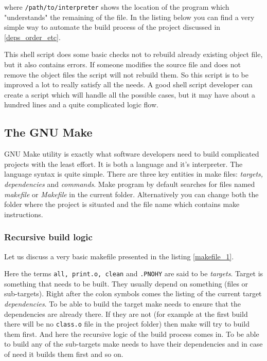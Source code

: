 where {\tt /path/to/interpreter} shows the location of the program which "understands" the remaining of the file. In the listing below you can find a very simple way to automate the build process of the project discussed in \ref{deps_order_etc}.



This shell script does some basic checks not to rebuild already existing object file, but it also contains errors. If someone modifies the source file and does not remove the object files the script will not rebuild them. So this script is to be improved a lot to really satisfy all the needs. A good shell script developer can create a script which will handle all the possible cases, but it may have about a hundred lines and a quite complicated logic flow.

\subsection{The GNU Make}
GNU Make utility is exactly what software developers need to build complicated projects with the least effort. It is both a language and it's interpreter. The language syntax is quite simple. There are three key entities in make files: \textit {targets, dependencies} and \textit {commands}. Make program by default searches for files named \textit {makefile} or \textit {Makefile} in the current folder. Alternatively you can change both the folder where the project is situated and the file name which contains make instructions.

\subsubsection{Recursive build logic}
Let us discuss a very basic makefile presented in the listing \ref{makefile_1}.


Here the terms {\tt all, print.o, clean} and {\tt .PNOHY} are said to be \textit {targets}. Target is something that needs to be built. They usually depend on something (files or sub-targets). Right after the colon symbols comes the listing of the current target \textit{dependencies}. To be able to build the target make needs to ensure that the dependencies are already there. If they are not (for example at the first build there will be no {\tt class.o} file in the project folder) then make will try to build them first. And here the recursive logic of the build process comes in. To be able to build any of the sub-targets make needs to have their dependencies and in case of need it builds them first and so on.

